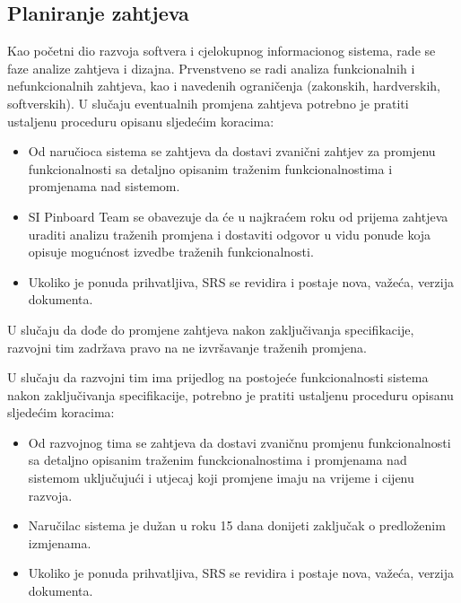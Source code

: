 \subsection{Planiranje zahtjeva}
Kao početni dio razvoja softvera i cjelokupnog informacionog sistema, rade se faze analize zahtjeva i dizajna. Prvenstveno se radi analiza funkcionalnih i nefunkcionalnih zahtjeva, kao i navedenih ograničenja (zakonskih, hardverskih, softverskih). U slučaju eventualnih promjena zahtjeva potrebno je pratiti ustaljenu proceduru opisanu sljedećim koracima:
\begin{itemize}
    \item Od naručioca sistema se zahtjeva da dostavi zvanični zahtjev za promjenu funkcionalnosti sa detaljno opisanim traženim funkcionalnostima i promjenama nad sistemom.
    \item SI Pinboard Team se obavezuje da će u najkraćem roku od prijema zahtjeva uraditi analizu traženih promjena i dostaviti odgovor u vidu ponude koja opisuje mogućnost izvedbe traženih funkcionalnosti.
    \item Ukoliko je ponuda prihvatljiva, SRS se revidira i postaje nova, važeća, verzija dokumenta.
\end{itemize}

U slučaju da dođe do promjene zahtjeva nakon zaključivanja specifikacije, razvojni tim zadržava pravo na ne izvršavanje traženih promjena.

U slučaju da razvojni tim ima prijedlog na postojeće funkcionalnosti sistema nakon zaključivanja specifikacije, potrebno je pratiti ustaljenu proceduru opisanu sljedećim koracima:
\begin{itemize}
    \item Od razvojnog tima se zahtjeva da dostavi zvaničnu promjenu funkcionalnosti sa detaljno opisanim traženim funckcionalnostima i promjenama nad sistemom uključujući i utjecaj koji promjene imaju na vrijeme i cijenu razvoja.
    \item Naručilac sistema je dužan u roku 15 dana donijeti zaključak o predloženim izmjenama.
    \item Ukoliko je ponuda prihvatljiva, SRS se revidira i postaje nova, važeća, verzija dokumenta.
\end{itemize}

